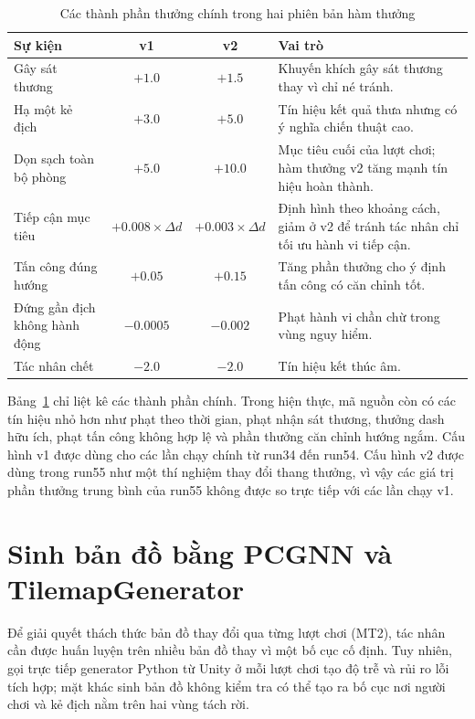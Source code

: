 \begin{table}[H]
    \centering
    \small
    \caption{Các thành phần thưởng chính trong hai phiên bản hàm thưởng}
    \label{tab:reward_components}
    \begin{tabular}{|p{4.4cm}|c|c|p{5.2cm}|}
        \hline
        \textbf{Sự kiện} & \textbf{v1} & \textbf{v2} & \textbf{Vai trò} \\
        \hline
        Gây sát thương & $+1.0$ & $+1.5$ & Khuyến khích gây sát thương thay vì chỉ né tránh. \\
        \hline
        Hạ một kẻ địch & $+3.0$ & $+5.0$ & Tín hiệu kết quả thưa nhưng có ý nghĩa chiến thuật cao. \\
        \hline
        Dọn sạch toàn bộ phòng & $+5.0$ & $+10.0$ & Mục tiêu cuối của lượt chơi; hàm thưởng v2 tăng mạnh tín hiệu hoàn thành. \\
        \hline
        Tiếp cận mục tiêu & $+0.008 \times \Delta d$ & $+0.003 \times \Delta d$ & Định hình theo khoảng cách, giảm ở v2 để tránh tác nhân chỉ tối ưu hành vi tiếp cận. \\
        \hline
        Tấn công đúng hướng & $+0.05$ & $+0.15$ & Tăng phần thưởng cho ý định tấn công có căn chỉnh tốt. \\
        \hline
        Đứng gần địch không hành động & $-0.0005$ & $-0.002$ & Phạt hành vi chần chừ trong vùng nguy hiểm. \\
        \hline
        Tác nhân chết & $-2.0$ & $-2.0$ & Tín hiệu kết thúc âm. \\
        \hline
    \end{tabular}
\end{table}

Bảng~\ref{tab:reward_components} chỉ liệt kê các thành phần chính. Trong hiện thực, mã nguồn còn có các tín hiệu nhỏ hơn như phạt theo thời gian, phạt nhận sát thương, thưởng dash hữu ích, phạt tấn công không hợp lệ và phần thưởng căn chỉnh hướng ngắm. Cấu hình v1 được dùng cho các lần chạy chính từ run34 đến run54. Cấu hình v2 được dùng trong run55 như một thí nghiệm thay đổi thang thưởng, vì vậy các giá trị phần thưởng trung bình của run55 không được so trực tiếp với các lần chạy v1.

\section{Sinh bản đồ bằng PCGNN và TilemapGenerator}

Để giải quyết thách thức bản đồ thay đổi qua từng lượt chơi (MT2), tác nhân cần được huấn luyện trên nhiều bản đồ thay vì một bố cục cố định. Tuy nhiên, gọi trực tiếp generator Python từ Unity ở mỗi lượt chơi tạo độ trễ và rủi ro lỗi tích hợp; mặt khác sinh bản đồ không kiểm tra có thể tạo ra bố cục nơi người chơi và kẻ địch nằm trên hai vùng tách rời.

